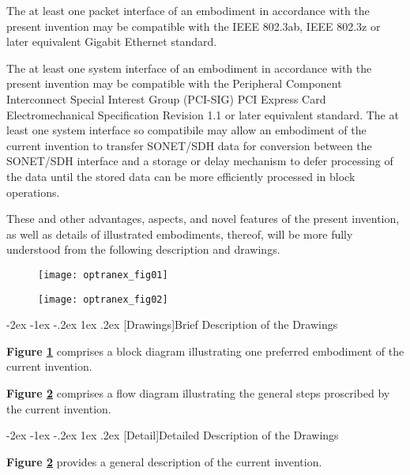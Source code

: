 \documentclass[letterpaper,final,notitlepage,twocolumn,10pt,twoside]{article}
\makeatletter
\let\large = \normalsize
\let\normalsize = \small
\let\small = \footnotesize
\let\footnotesize = \scriptsize
\let\scriptsize = \tiny
\renewcommand\section{\@startsection {section}{1}{\z@}%
                                   {-2ex \@plus -1ex \@minus -.2ex}%
                                   {1ex \@plus .2ex}%
                                   {\normalfont\large\bfseries}}
\makeatother
\begin{document}
The at least one packet interface of an embodiment in accordance with the
present invention may be compatible with the IEEE 802.3ab, IEEE 802.3z or
later equivalent Gigabit Ethernet standard.

The at least one system interface of an embodiment in accordance with the
present invention may be compatible with the Peripheral Component Interconnect
Special Interest Group (PCI-SIG) PCI Express Card Electromechanical
Specification Revision 1.1 or later equivalent standard.  \nocite{PCIeCEM} The
at least one system interface so compatibile may allow an embodiment of the
current invention to transfer SONET/SDH data for conversion between the
SONET/SDH interface and a storage or delay mechanism to defer processing of
the data until the stored data can be more efficiently processed in block
operations.

These and other advantages, aspects, and novel features of the present
invention, as well as details of illustrated embodiments, thereof, will be
more fully understood from the following description and drawings.

\onecolumn
\begin{figure}[htp]
\center\texttt{[image: optranex\_fig01]}
\caption[Figure1]{}
\label{figure:optranex_fig01}
\end{figure}

\begin{figure}[htp]
\center\texttt{[image: optranex\_fig02]}
\caption[Figure1]{}
\label{figure:optranex_fig02}
\end{figure}
\twocolumn

\section[Drawings]{Brief Description of the Drawings}

\textbf{Figure \ref{figure:optranex_fig01}} comprises a block diagram
illustrating one preferred embodiment of the current invention.

\noindent
\textbf{Figure \ref{figure:optranex_fig02}} comprises a flow diagram
illustrating the general steps proscribed by the current invention.

\section[Detail]{Detailed Description of the Drawings}

\textbf{Figure \ref{figure:optranex_fig02}} provides a general description of
the current invention.
\end{document}
